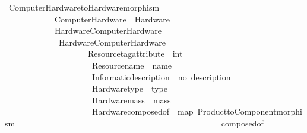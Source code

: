 \begin{isabellebody}
\begin{isamarkuptext}
\begin{isarbox}
\begin{isabelle}
\ Computer{\isacharunderscore}{\kern0pt}Hardware{\isacharunderscore}{\kern0pt}to{\isacharunderscore}{\kern0pt}Hardware{\isacharunderscore}{\kern0pt}morphism\ {\isacharcolon}{\kern0pt}{\isacharcolon}{\kern0pt}\isanewline
\ \ \ \ \ \ \ \ \ \ \ \ {\isachardoublequoteopen}Computer{\isacharunderscore}{\kern0pt}Hardware\ {\isasymRightarrow}\ Hardware{\isachardoublequoteclose}\isanewline
\ \ \ \ \ \ \ \ \ \ \ {\isacharparenleft}{\kern0pt}{\isachardoublequoteopen}{\isacharunderscore}{\kern0pt}\ {\isasymlangle}Hardware{\isasymrangle}\isactrlsub C\isactrlsub o\isactrlsub m\isactrlsub p\isactrlsub u\isactrlsub t\isactrlsub e\isactrlsub r\isactrlsub H\isactrlsub a\isactrlsub r\isactrlsub d\isactrlsub w\isactrlsub a\isactrlsub r\isactrlsub e{\isachardoublequoteclose}\ {\isacharbrackleft}{\kern0pt}{}{}{}{}{\isacharbrackright}{\kern0pt}{}{}{}{\isacharparenright}{\kern0pt}\isanewline
\ \ \ \ \ \ \ \ \ \ \ \ {\isachardoublequoteopen}{\isasymsigma}\ {\isasymlangle}Hardware{\isasymrangle}\isactrlsub C\isactrlsub o\isactrlsub m\isactrlsub p\isactrlsub u\isactrlsub t\isactrlsub e\isactrlsub r\isactrlsub H\isactrlsub a\isactrlsub r\isactrlsub d\isactrlsub w\isactrlsub a\isactrlsub r\isactrlsub e\ {\isacharequal}{\kern0pt}\isanewline
\ \ \ \ \ \ \ \ \ \ \ \ \ \ \ \ \ \ {\isasymlparr}\ \ Resource{\isachardot}{\kern0pt}tag{\isacharunderscore}{\kern0pt}attribute\ {\isacharequal}{\kern0pt}\ {}{\isacharcolon}{\kern0pt}{\isacharcolon}{\kern0pt}int\ {\isacharcomma}{\kern0pt}\isanewline
\ \ \ \ \ \ \ \ \ \ \ \ \ \ \ \ \ \ \ \ \ Resource{\isachardot}{\kern0pt}name\ {\isacharequal}{\kern0pt}\ name\ {\isasymsigma}\ {\isacharcomma}{\kern0pt}\isanewline
\ \ \ \ \ \ \ \ \ \ \ \ \ \ \ \ \ \ \ \ \ Informatic{\isachardot}{\kern0pt}description\ {\isacharequal}{\kern0pt}\ {\isacharprime}{\kern0pt}{\isacharprime}{\kern0pt}no\ description{\isacharprime}{\kern0pt}{\isacharprime}{\kern0pt}{\isacharcomma}{\kern0pt}\ \isanewline
\ \ \ \ \ \ \ \ \ \ \ \ \ \ \ \ \ \ \ \ \ Hardware{\isachardot}{\kern0pt}type\ {\isacharequal}{\kern0pt}\ type\ {\isasymsigma}\ {\isacharcomma}{\kern0pt}\isanewline
\ \ \ \ \ \ \ \ \ \ \ \ \ \ \ \ \ \ \ \ \ Hardware{\isachardot}{\kern0pt}mass\ {\isacharequal}{\kern0pt}\ mass\ {\isasymsigma}\ {\isacharcomma}{\kern0pt}\isanewline
\ \ \ \ \ \ \ \ \ \ \ \ \ \ \ \ \ \ \ \ \ Hardware{\isachardot}{\kern0pt}composed{\isacharunderscore}{\kern0pt}of\ {\isacharequal}{\kern0pt}\ map\ Product{\isacharunderscore}{\kern0pt}to{\isacharunderscore}{\kern0pt}Component{\isacharunderscore}{\kern0pt}morphism\ \isanewline
\ \ \ \ \ \ \ \ \ \ \ \ \ \ \ \ \ \ \ \ \ \ \ \ \ \ \ \ \ \ \ \ \ \ \ \ \ \ \ \ \ \ \ \ \ \ \ \ {\isacharparenleft}{\kern0pt}composed{\isacharunderscore}{\kern0pt}of\ {\isasymsigma}{\isacharparenright}{\kern0pt}\ {\isasymrparr}{\isachardoublequoteclose}
\end{isabelle}
\end{isarbox}



\end{isamarkuptext}
\end{isabellebody}
